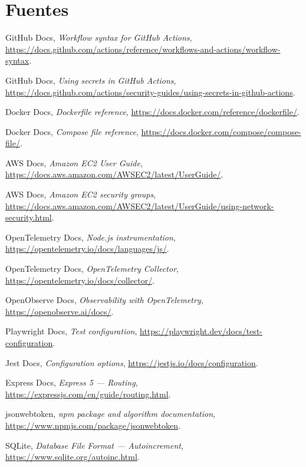 \documentclass[12pt,a4paper]{article}
\begin{document}
\section{Fuentes}
\begin{enumerate}[label={[\arabic*.]}]
  \item GitHub Docs, \textit{Workflow syntax for GitHub Actions}, \url{https://docs.github.com/actions/reference/workflows-and-actions/workflow-syntax}.
  \item GitHub Docs, \textit{Using secrets in GitHub Actions}, \url{https://docs.github.com/actions/security-guides/using-secrets-in-github-actions}.
  \item Docker Docs, \textit{Dockerfile reference}, \url{https://docs.docker.com/reference/dockerfile/}.
  \item Docker Docs, \textit{Compose file reference}, \url{https://docs.docker.com/compose/compose-file/}.
  \item AWS Docs, \textit{Amazon EC2 User Guide}, \url{https://docs.aws.amazon.com/AWSEC2/latest/UserGuide/}.
  \item AWS Docs, \textit{Amazon EC2 security groups}, \url{https://docs.aws.amazon.com/AWSEC2/latest/UserGuide/using-network-security.html}.
  \item OpenTelemetry Docs, \textit{Node.js instrumentation}, \url{https://opentelemetry.io/docs/languages/js/}.
  \item OpenTelemetry Docs, \textit{OpenTelemetry Collector}, \url{https://opentelemetry.io/docs/collector/}.
  \item OpenObserve Docs, \textit{Observability with OpenTelemetry}, \url{https://openobserve.ai/docs/}.
  \item Playwright Docs, \textit{Test configuration}, \url{https://playwright.dev/docs/test-configuration}.
  \item Jest Docs, \textit{Configuration options}, \url{https://jestjs.io/docs/configuration}.
  \item Express Docs, \textit{Express 5 --- Routing}, \url{https://expressjs.com/en/guide/routing.html}.
  \item jsonwebtoken, \textit{npm package and algorithm documentation}, \url{https://www.npmjs.com/package/jsonwebtoken}.
  \item SQLite, \textit{Database File Format --- Autoincrement}, \url{https://www.sqlite.org/autoinc.html}.
\end{enumerate}

\appendix
\end{document}
